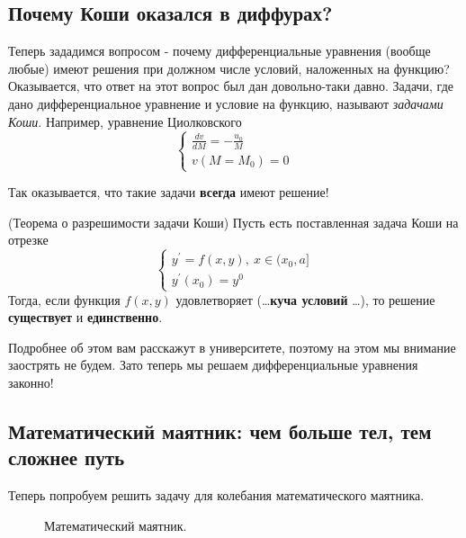 \subsection{Почему Коши оказался в диффурах?}
Теперь зададимся вопросом - почему дифференциальные уравнения (вообще любые) имеют решения при должном числе условий, наложенных на функцию? Оказывается, что ответ на этот вопрос был дан довольно-таки давно. Задачи, где дано дифференциальное уравнение и условие на функцию, называют \textit{задачами Коши}. Например, уравнение Циолковского
\begin{equation*}
    \begin{cases}
        \frac{dv}{dM}= - \frac{u_0}{M}\\
        v(M = M_0) = 0
    \end{cases}
\end{equation*}

Так оказывается, что такие задачи \textbf{всегда} имеют решение!
\begin{theorem}(Теорема о разрешимости задачи Коши)
    Пусть есть поставленная задача Коши на отрезке
    \begin{equation*}
        \begin{cases}
            y^{'} = f(x,y),\ x \in (x_0, a]\\
            y^{'}(x_0) = y^{0}
        \end{cases}
    \end{equation*}
    Тогда, если функция $f(x,y)$ удовлетворяет (\dots \textbf{куча условий} \dots), то решение \textbf{существует} и \textbf{единственно}.
\end{theorem}
Подробнее об этом вам расскажут в университете, поэтому на этом мы внимание заострять не будем. Зато теперь мы решаем дифференциальные уравнения законно!
\subsection{Математический маятник: чем больше тел, тем сложнее путь}
Теперь попробуем решить задачу для колебания математического маятника.
\begin{figure}[h!]
    \caption{Математический маятник.}
\end{figure}

